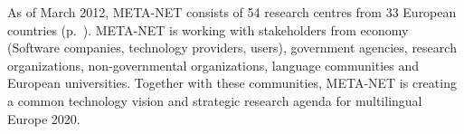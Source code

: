 \begin{Parallel}[c]{78mm}{78mm}
{As of March 2012, META-NET consists of 54 research centres from 33
European countries (p.~\pageref{metanetmembers}). META-NET is working
with stakeholders from economy (Software companies, technology
providers, users), government agencies, research organizations,
non-governmental organizations, language communities and European
universities. Together with these communities, META-NET is creating a
common technology vision and strategic research agenda for
multilingual Europe 2020.}  \ParallelPar
\end{Parallel}

\makefundingnotice


\renewcommand\contentsname{}

\tableofcontents



\cleardoublepage

\setcounter{page}{1}
\pagestyle{scrheadings}


